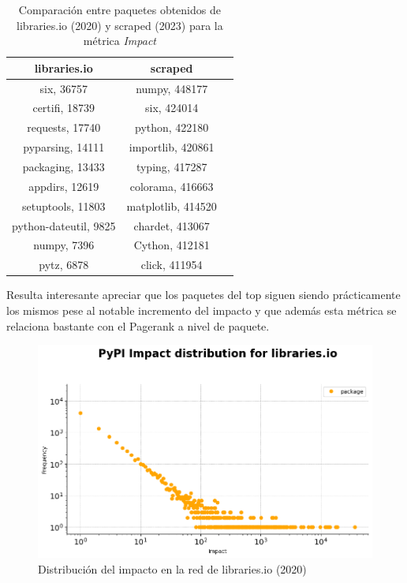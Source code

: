 \begin{table}[h!]
    \centering
    \caption{Comparación entre paquetes obtenidos de libraries.io (2020) y scraped (2023) para la métrica \textit{Impact}}
    \begin{tabular}{|c|c|c|}
        \hline
        \textbf{libraries.io} & \textbf{scraped}   \\
        \hline
        six, 36757            & numpy, 448177      \\
        certifi, 18739        & six, 424014        \\
        requests, 17740       & python, 422180     \\
        pyparsing, 14111      & importlib, 420861  \\
        packaging, 13433      & typing, 417287     \\
        appdirs, 12619        & colorama, 416663   \\
        setuptools, 11803     & matplotlib, 414520 \\
        python-dateutil, 9825 & chardet, 413067    \\
        numpy, 7396           & Cython, 412181     \\
        pytz, 6878            & click, 411954      \\
        \hline
    \end{tabular}
\end{table}


Resulta interesante apreciar que los paquetes del top siguen siendo prácticamente los mismos
pese al notable incremento del impacto y que además esta métrica se relaciona bastante con el
Pagerank a nivel de paquete.

\begin{figure}[h!]
    \begin{center}
        \includegraphics[width=1\textwidth]{img/pypi/librariesio_impact_distribution.png}
        \caption{Distribución del impacto en la red de libraries.io (2020)}
        \label{fig:Distribución del impacto en la red de libraries.io}
    \end{center}
\end{figure}

